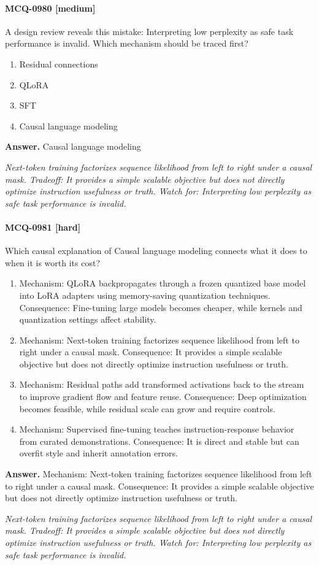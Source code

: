 \paragraph{MCQ-0980 [medium]} A design review reveals this mistake: Interpreting low perplexity as safe task performance is invalid. Which mechanism should be traced first?
\begin{enumerate}[label=\Alph*.]
\item Residual connections
\item QLoRA
\item SFT
\item Causal language modeling
\end{enumerate}
\noindent\textbf{Answer.} Causal language modeling
\par\textit{Next-token training factorizes sequence likelihood from left to right under a causal mask. Tradeoff: It provides a simple scalable objective but does not directly optimize instruction usefulness or truth. Watch for: Interpreting low perplexity as safe task performance is invalid.}
\paragraph{MCQ-0981 [hard]} Which causal explanation of Causal language modeling connects what it does to when it is worth its cost?
\begin{enumerate}[label=\Alph*.]
\item Mechanism: QLoRA backpropagates through a frozen quantized base model into LoRA adapters using memory-saving quantization techniques. Consequence: Fine-tuning large models becomes cheaper, while kernels and quantization settings affect stability.
\item Mechanism: Next-token training factorizes sequence likelihood from left to right under a causal mask. Consequence: It provides a simple scalable objective but does not directly optimize instruction usefulness or truth.
\item Mechanism: Residual paths add transformed activations back to the stream to improve gradient flow and feature reuse. Consequence: Deep optimization becomes feasible, while residual scale can grow and require controls.
\item Mechanism: Supervised fine-tuning teaches instruction-response behavior from curated demonstrations. Consequence: It is direct and stable but can overfit style and inherit annotation errors.
\end{enumerate}
\noindent\textbf{Answer.} Mechanism: Next-token training factorizes sequence likelihood from left to right under a causal mask. Consequence: It provides a simple scalable objective but does not directly optimize instruction usefulness or truth.
\par\textit{Next-token training factorizes sequence likelihood from left to right under a causal mask. Tradeoff: It provides a simple scalable objective but does not directly optimize instruction usefulness or truth. Watch for: Interpreting low perplexity as safe task performance is invalid.}
